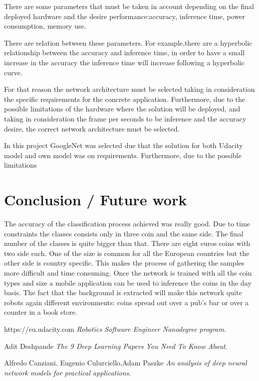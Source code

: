 \documentclass[10pt,journal,compsoc]{IEEEtran}
\begin{document}
There are some parameters that must be taken in account depending on the final deployed hardware and the desire performance:accuracy, inference time, power consumption, memory use.\cite{analysisdnn}

There are relation between these parameters. For example,there are a hyperbolic relationship between the accuracy and inference time, in order to have a small increase in the accuracy the inference time will increase following a hyperbolic curve. 

For that reason the network architecture must be selected taking in consideration the specific requirements for the concrete application. Furthermore, due to the possible limitations of the hardware where the solution will be deployed, and taking in consideration the frame per seconds to be inference and the accuracy desire, the correct network architecture must be selected. 

In this project GoogleNet was selected due that the solution for both Udacity model and own model was on requirements. Furthermore, due to the possible limitations 

	
\section{Conclusion / Future work}

The accuracy of the classification process achieved was really good. Due to time constraints the classes consists only in three coin and the same side. The final number of the classes is quite bigger than that. There are eight euros coins with two side each. One of the size is common for all the European countries but the other side is country specific. This makes the process of gathering the samples more difficult and time consuming. Once the network is trained with all the coin types and size a mobile application can be used to inference the coins in the day basis. The fact that the background is extracted will make this network quite robots again different environments: coins spread out over a pub's bar or over a counter in a book store.


\begin{thebibliography}{9}


https://eu.udacity.com
\textit{Robotics Software Engineer Nanodegree program}. 

Adit Deshpande
\textit{The 9 Deep Learning Papers You Need To Know About}. 

Alfredo Canziani, Eugenio Culurciello,Adam Paszke  
\textit{An analysis of deep neural network models for practical applications}. 
\end{thebibliography}
		
\end{document}
